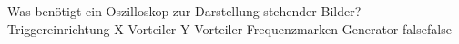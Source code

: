     {Was benötigt ein Oszilloskop zur Darstellung stehender Bilder?}
    {Triggereinrichtung}
    {X-Vorteiler}
    {Y-Vorteiler}
    {Frequenzmarken-Generator}
    {false}{false}